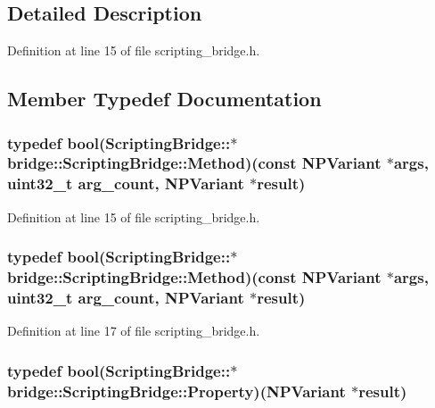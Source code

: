 \subsection{Detailed Description}


Definition at line 15 of file scripting\_\-bridge.h.



\subsection{Member Typedef Documentation}
\hypertarget{classbridge_1_1_scripting_bridge_aa2d60d52b4e91aa7659850b73f393727}{
\subsubsection[{Method}]{\setlength{\rightskip}{0pt plus 5cm}typedef bool(ScriptingBridge::$\ast$ {\bf bridge::ScriptingBridge::Method})(const NPVariant $\ast$args, uint32\_\-t arg\_\-count, NPVariant $\ast$result)}}
\label{classbridge_1_1_scripting_bridge_aa2d60d52b4e91aa7659850b73f393727}


Definition at line 15 of file scripting\_\-bridge.h.

\hypertarget{classbridge_1_1_scripting_bridge_aa2d60d52b4e91aa7659850b73f393727}{
\subsubsection[{Method}]{\setlength{\rightskip}{0pt plus 5cm}typedef bool(ScriptingBridge::$\ast$ {\bf bridge::ScriptingBridge::Method})(const NPVariant $\ast$args, uint32\_\-t arg\_\-count, NPVariant $\ast$result)}}
\label{classbridge_1_1_scripting_bridge_aa2d60d52b4e91aa7659850b73f393727}


Definition at line 17 of file scripting\_\-bridge.h.

\hypertarget{classbridge_1_1_scripting_bridge_a9063ac1ad0b4e1a439e954e7a505057d}{
\subsubsection[{Property}]{\setlength{\rightskip}{0pt plus 5cm}typedef bool(ScriptingBridge::$\ast$ {\bf bridge::ScriptingBridge::Property})(NPVariant $\ast$result)}}
\label{classbridge_1_1_scripting_bridge_a9063ac1ad0b4e1a439e954e7a505057d}


